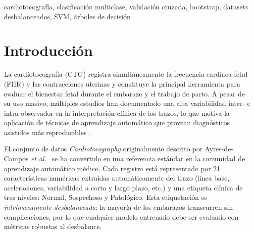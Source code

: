 \documentclass[conference]{IEEEtran}
\begin{document}
\begin{IEEEkeywords}
cardiotocograf\'ia, clasificaci\'on multiclase, validaci\'on cruzada, bootstrap, datasets desbalanceados, SVM, \'arboles de decisi\'on
\end{IEEEkeywords}

\section{Introducci\'on}
La cardiotocograf\'ia (CTG) registra simult\'aneamente la frecuencia card\'iaca fetal (FHR) y las contracciones uterinas y constituye la principal herramienta para evaluar el bienestar fetal durante el embarazo y el trabajo de parto. A pesar de su uso masivo, m\'ultiples estudios han documentado una alta variabilidad inter- e intra-observador en la interpretaci\'on cl\'inica de los trazos, lo que motiva la aplicaci\'on de t\'ecnicas de aprendizaje autom\'atico que provean diagn\'osticos asistidos m\'as reproducibles \cite{ayres2000sisporto}.

El conjunto de datos \emph{Cardiotocography} originalmente descrito por Ayres-de-Campos \emph{et al.}~\cite{ayres2000sisporto} se ha convertido en una referencia est\'andar en la comunidad de aprendizaje autom\'atico m\'edico. Cada registro est\'a representado por 21 caracter\'isticas num\'ericas extra\'idas autom\'aticamente del trazo (l\'inea base, aceleraciones, variabilidad a corto y largo plazo, etc.) y una etiqueta cl\'inica de tres niveles: Normal, Sospechoso y Patol\'ogico. Esta etiquetaci\'on es \emph{intr\'insecamente desbalanceada}: la mayor\'ia de los embarazos transcurren sin complicaciones, por lo que cualquier modelo entrenado debe ser evaluado con m\'etricas robustas al desbalance.
\end{document}
